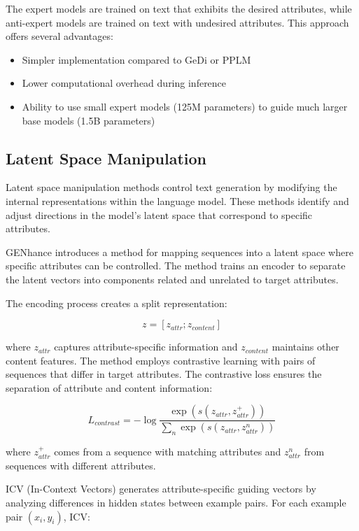 The expert models are trained on text that exhibits the desired attributes, while anti-expert models are trained on text with undesired attributes. This approach offers several advantages:

\begin{itemize}
    \item Simpler implementation compared to GeDi or PPLM
    \item Lower computational overhead during inference
    \item Ability to use small expert models (125M parameters) to guide much larger base models (1.5B parameters)
\end{itemize}

\subsection{Latent Space Manipulation}

Latent space manipulation methods control text generation by modifying the internal representations within the language model. These methods identify and adjust directions in the model's latent space that correspond to specific attributes.

GENhance introduces a method for mapping sequences into a latent space where specific attributes can be controlled. The method trains an encoder to separate the latent vectors into components related and unrelated to target attributes. 

The encoding process creates a split representation:

\begin{equation}
    z = [z_{attr}; z_{content}]
\end{equation}

where $z_{attr}$ captures attribute-specific information and $z_{content}$ maintains other content features. The method employs contrastive learning with pairs of sequences that differ in target attributes. The contrastive loss ensures the separation of attribute and content information:

\begin{equation}
    L_{contrast} = -\log\frac{\exp(s(z_{attr}, z^+_{attr}))}{\sum_{n} \exp(s(z_{attr}, z^n_{attr}))}
\end{equation}

where $z^+_{attr}$ comes from a sequence with matching attributes and $z^n_{attr}$ from sequences with different attributes.

ICV (In-Context Vectors) generates attribute-specific guiding vectors by analyzing differences in hidden states between example pairs. For each example pair $(x_i, y_i)$, ICV:

